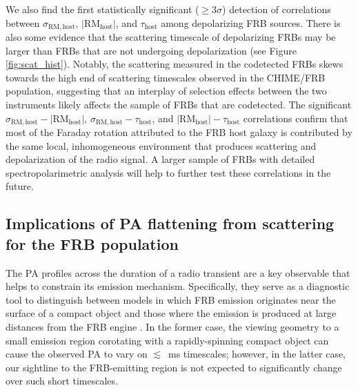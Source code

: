 \documentclass[twocolumn, linenumbers]{aastex701}
\begin{document}
We also find the first statistically significant ($\geq 3 \sigma$) detection of correlations between $\sigma_\mathrm{RM,host}$, $|\mathrm{RM}_\mathrm{host}|$, and $\tau_\mathrm{host}$ among depolarizing FRB sources. There is also some evidence that the scattering timescale of depolarizing FRBs may be larger than FRBs that are not undergoing depolarization (see Figure \ref{fig:scat_hist}). Notably, the scattering measured in the codetected FRBs skews towards the high end of scattering timescales observed in the CHIME/FRB population, suggesting that an interplay of selection effects between the two instruments likely affects the sample of FRBs that are codetected. The significant $\sigma_\mathrm{RM,host}-|\mathrm{RM}_\mathrm{host}|$, $\sigma_\mathrm{RM,host}-\tau_\mathrm{host}$, and $|\mathrm{RM}_\mathrm{host}|-\tau_\mathrm{host}$ correlations confirm that most of the Faraday rotation attributed to the FRB host galaxy is contributed by the same local, inhomogeneous environment that produces scattering and depolarization of the radio signal. A larger sample of FRBs with detailed spectropolarimetric analysis will help to further test these correlations in the future. 

\subsection{Implications of PA flattening from scattering for the FRB population} \label{sec:discussion_pa}
The PA profiles across the duration of a radio transient are a key observable that helps to constrain its emission mechanism. Specifically, they serve as a diagnostic tool to distinguish between models in which FRB emission originates near the surface of a compact object \citep[``close-in'' models, e.g. from coherent-curvature radiation or magnetic reconnection;][]{2017MNRAS.468.2726K, 2018ApJ...868...31Y, 2020arXiv200505093L, 2021ApJ...922..166L} and those where the emission is produced at large distances from the FRB engine \citep[``far-out'' models, e.g. by synchrotron maser emission;][]{2019MNRAS.485.4091M, 2020ApJ...896..142B}. In the former case, the viewing geometry to a small emission region corotating with a rapidly-spinning compact object can cause the observed PA to vary on $\lesssim$~ms timescales; however, in the latter case, our sightline to the FRB-emitting region is not expected to significantly change over such short timescales.
\end{document}

